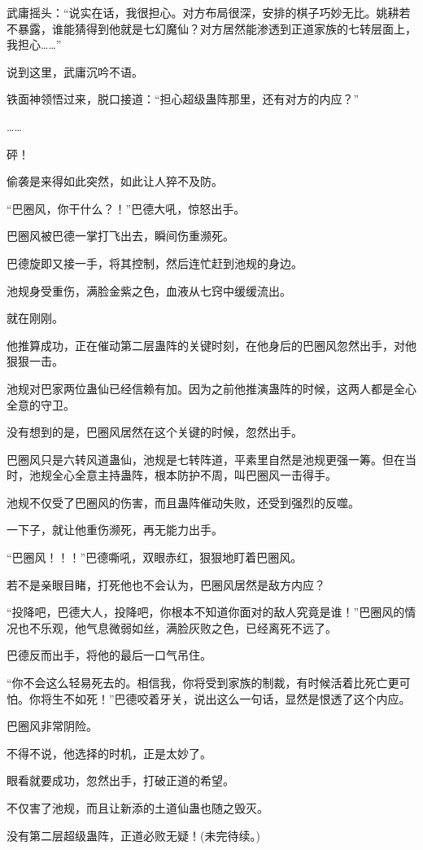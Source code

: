 \begin{this_body}
武庸摇头：“说实在话，我很担心。对方布局很深，安排的棋子巧妙无比。姚耕若不暴露，谁能猜得到他就是七幻魔仙？对方居然能渗透到正道家族的七转层面上，我担心……”

说到这里，武庸沉吟不语。

铁面神领悟过来，脱口接道：“担心超级蛊阵那里，还有对方的内应？”

……

砰！

偷袭是来得如此突然，如此让人猝不及防。

“巴圈风，你干什么？！”巴德大吼，惊怒出手。

巴圈风被巴德一掌打飞出去，瞬间伤重濒死。

巴德旋即又接一手，将其控制，然后连忙赶到池规的身边。

池规身受重伤，满脸金紫之色，血液从七窍中缓缓流出。

就在刚刚。

他推算成功，正在催动第二层蛊阵的关键时刻，在他身后的巴圈风忽然出手，对他狠狠一击。

池规对巴家两位蛊仙已经信赖有加。因为之前他推演蛊阵的时候，这两人都是全心全意的守卫。

没有想到的是，巴圈风居然在这个关键的时候，忽然出手。

巴圈风只是六转风道蛊仙，池规是七转阵道，平素里自然是池规更强一筹。但在当时，池规全心全意主持蛊阵，根本防护不周，叫巴圈风一击得手。

池规不仅受了巴圈风的伤害，而且蛊阵催动失败，还受到强烈的反噬。

一下子，就让他重伤濒死，再无能力出手。

“巴圈风！！！”巴德嘶吼，双眼赤红，狠狠地盯着巴圈风。

若不是亲眼目睹，打死他也不会认为，巴圈风居然是敌方内应？

“投降吧，巴德大人，投降吧，你根本不知道你面对的敌人究竟是谁！”巴圈风的情况也不乐观，他气息微弱如丝，满脸灰败之色，已经离死不远了。

巴德反而出手，将他的最后一口气吊住。

“你不会这么轻易死去的。相信我，你将受到家族的制裁，有时候活着比死亡更可怕。你将生不如死！”巴德咬着牙关，说出这么一句话，显然是恨透了这个内应。

巴圈风非常阴险。

不得不说，他选择的时机，正是太妙了。

眼看就要成功，忽然出手，打破正道的希望。

不仅害了池规，而且让新添的土道仙蛊也随之毁灭。

没有第二层超级蛊阵，正道必败无疑！(未完待续。)

\end{this_body}

